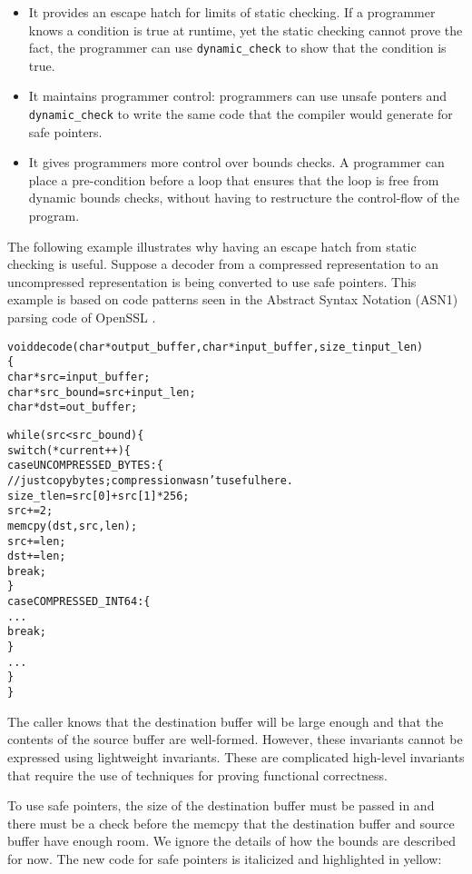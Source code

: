 \begin{itemize}
\item
  It provides an escape hatch for limits of static checking. If a
  programmer knows a condition is true at runtime, yet the static
  checking cannot prove the fact, the programmer can use
  \texttt{dynamic\_check} to show that the condition is true.
\item
  It maintains programmer control: programmers can use unsafe ponters
  and \texttt{dynamic\_check} to write the same code that the compiler
  would generate for safe pointers.
\item
  It gives programmers more control over bounds checks. A programmer can
  place a pre-condition before a loop that ensures that the loop is free
  from dynamic bounds checks, without having to restructure the
  control-flow of the program.
\end{itemize}

The following example illustrates why having an escape hatch from static
checking is useful. Suppose a decoder from a compressed representation
to an uncompressed representation is being converted to use safe
pointers. This example is based on code patterns seen in the Abstract
Syntax Notation (ASN1) parsing code of OpenSSL \cite{OpenSSL2015}.

\begin{alltt}
void decode(char *output\_buffer, char *input\_buffer, size\_t input\_len)
\{
    char *src = input\_buffer;
    char *src\_bound = src + input\_len;
    char *dst = out\_buffer;

    while (src < src\_bound) \{
        switch (*current++) \{
            case UNCOMPRESSED\_BYTES: \{ 
                // just copy bytes; compression wasn't useful here.
                size_t len = src[0] + src[1]*256;
                src += 2;
                memcpy(dst, src, len);
                src += len;
                dst += len;
                break;
            \}
            case COMPRESSED\_INT64: \{
                ...
                break;
            \}
        ...
    \}
\}
\end{alltt}

The caller knows that the destination buffer will be large enough and
that the contents of the source buffer are well-formed. However, these
invariants cannot be expressed using lightweight invariants. These are
complicated high-level invariants that require the use of techniques for
proving functional correctness.

To use safe pointers, the size of the destination buffer must be passed
in and there must be a check before the memcpy that the destination
buffer and source buffer have enough room. We ignore the details of how
the bounds are described for now.    The new code for safe pointers is italicized
and highlighted in yellow:

